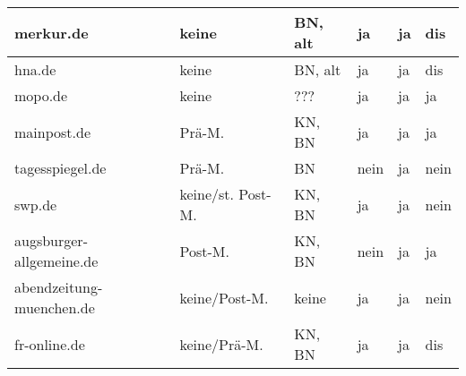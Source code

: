 \begin{longtable}{p{28mm}*{5}{l}}
merkur.de
& keine
& BN, alt
& ja
& ja
& dis
\\*\midrule

hna.de
& keine
& BN, alt
& ja
& ja
& dis
\\*\midrule

mopo.de
& keine
& ???
& ja
& ja
& ja
\\*\midrule

mainpost.de
& Prä-M.
& KN, BN
& ja
& ja
& ja
\\*\midrule

tagesspiegel.de
& Prä-M.
& BN
& nein
& ja
& nein
\\*\midrule

swp.de
& keine/st. Post-M.
& KN, BN
& ja
& ja
& nein
\\*\midrule

augsburger-allgemeine.de
& Post-M.
& KN, BN
& nein
& ja
& ja
\\*\midrule

abendzeitung-muenchen.de
& keine/Post-M.
& keine
& ja
& ja
& nein

\\*\midrule

fr-online.de
& keine/Prä-M.
& KN, BN
& ja
& ja
& dis


  \end{longtable}
\endgroup

